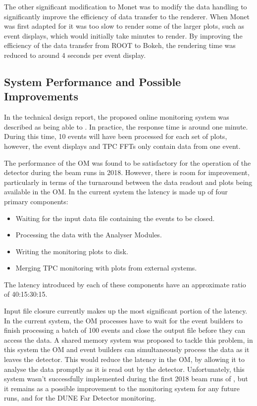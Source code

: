 The other significant modification to Monet was to modify the data handling to 
significantly improve the efficiency of data transfer to the renderer.
When Monet was first adapted for \protodune{} it was too slow to render some 
of the larger plots, such as event displays, which would initially take 
minutes to render. By improving the efficiency of the data transfer from ROOT 
to Bokeh, the rendering time was reduced to around 4 seconds per event display.

\subsection{System Performance and Possible Improvements}
In the \protodune{} technical design report\cite{Abi:2017aow}, the proposed 
online monitoring system was described as being able to . In practice, the response time is around one 
minute. During this time, 10 events will have been processed for each set of 
plots, however, the event displays and TPC FFTs only contain data from one 
event.

The performance of the OM was found to be satisfactory for the operation of the
\protodune{} detector during the beam runs in 2018. However, there is room for
improvement, particularly in terms of the turnaround between the data readout 
and plots being available in the OM. In the current system the latency is made 
up of four primary components:
\begin{itemize}
	\item Waiting for the input data file containing the events to be closed.
	\item Processing the data with the Analyser Modules.
	\item Writing the monitoring plots to disk.
	\item Merging TPC monitoring with plots from external systems.
\end{itemize}
The latency introduced by each of these components have an approximate ratio of 
40:15:30:15. 

Input file closure currently makes up the most significant portion 
of the latency. In the current system, the OM processes have to wait for the 
event builders to finish processing a batch of 100 events and close the output 
file before they can access the data. A shared memory system was proposed to 
tackle this problem, in this system the OM and event builders can 
simultaneously process the data as it leaves the detector. This would reduce 
the latency in the OM, by allowing it to analyse the data promptly as it is 
read out by the detector. Unfortunately, this system wasn't successfully 
implemented during the first 2018 beam runs of \protodune{}, but it remains as 
a possible improvement to the monitoring system for any future \protodune{} 
runs, and for the DUNE Far Detector monitoring.

